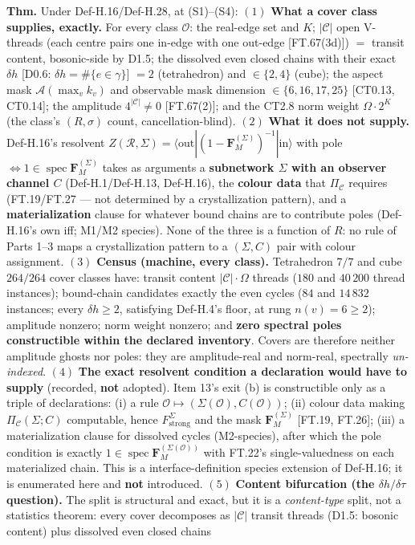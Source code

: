 \begin{theorem}\label{tag:FT-80}
\textbf{Thm.} Under Def-H.16/Def-H.28, at (S1)–(S4): $(1)$ \textbf{What a cover class supplies, exactly.} For every class $\mathcal O$: the real-edge set and $K$; $|\mathcal C|$ open V-threads (each centre pairs one in-edge with one out-edge [FT.67(3d)]) $=$ transit content, bosonic-side by D1.5; the dissolved even closed chains with their exact $\delta h$ [D0.6: $\delta h=\#\{e\in\gamma\}$] $=2$ (tetrahedron) and $\in\{2,4\}$ (cube); the aspect mask $\mathcal A(\max_vk_v)$ and observable mask dimension $\in\{6,16,17,25\}$ [CT0.13, CT0.14]; the amplitude $4^{|\mathcal C|}\ne0$ [FT.67(2)]; and the CT2.8 norm weight $\Omega\cdot2^{K}$ (the class's $(R,\sigma)$ count, cancellation-blind). $(2)$ \textbf{What it does not supply.} Def-H.16's resolvent $Z(\mathcal R,\Sigma)=\langle\mathrm{out}|(1-\mathbf F_M^{(\Sigma)})^{-1}|\mathrm{in}\rangle$ with pole $\iff1\in\operatorname{spec}\mathbf F_M^{(\Sigma)}$ takes as arguments a \textbf{subnetwork $\Sigma$ with an observer channel $C$} (Def-H.1/Def-H.13, Def-H.16), the \textbf{colour data} that $\Pi_{\mathcal C}$ requires (FT.19/FT.27 — not determined by a crystallization pattern), and a \textbf{materialization} clause for whatever bound chains are to contribute poles (Def-H.16's own iff; M1/M2 species). None of the three is a function of $R$: no rule of Parts 1–3 maps a crystallization pattern to a $(\Sigma,C)$ pair with colour assignment. $(3)$ \textbf{Census (machine, every class).} Tetrahedron $7/7$ and cube $264/264$ cover classes have: transit content $|\mathcal C|\cdot\Omega$ threads ($180$ and $40\,200$ thread instances); bound-chain candidates exactly the even cycles ($84$ and $14\,832$ instances; every $\delta h\ge2$, satisfying Def-H.4's floor, at rung $n(v)=6\ge2$); amplitude nonzero; norm weight nonzero; and \textbf{zero spectral poles constructible within the declared inventory}. Covers are therefore neither amplitude ghosts nor poles: they are amplitude-real and norm-real, spectrally \textit{un-indexed}. $(4)$ \textbf{The exact resolvent condition a declaration would have to supply} (recorded, \textbf{not} adopted). Item 13's exit (b) is constructible only as a triple of declarations: (i) a rule $\mathcal O\mapsto(\Sigma(\mathcal O),C(\mathcal O))$; (ii) colour data making $\Pi_{\mathcal C}(\Sigma;C)$ computable, hence $F^{\Sigma}_{\mathrm{strong}}$ and the mask $\mathbf F_M^{(\Sigma)}$ [FT.19, FT.26]; (iii) a materialization clause for dissolved cycles (M2-species), after which the pole condition is exactly $1\in\operatorname{spec}\mathbf F_M^{(\Sigma(\mathcal O))}$ with FT.22's single-valuedness on each materialized chain. This is a interface-definition species extension of Def-H.16; it is enumerated here and \textbf{not} introduced. $(5)$ \textbf{Content bifurcation (the $\delta h/\delta\tau$ question).} The split is structural and exact, but it is a \textit{content-type} split, not a statistics theorem: every cover decomposes as $|\mathcal C|$ transit threads (D1.5: bosonic content) plus dissolved even closed chains 
\end{theorem}
